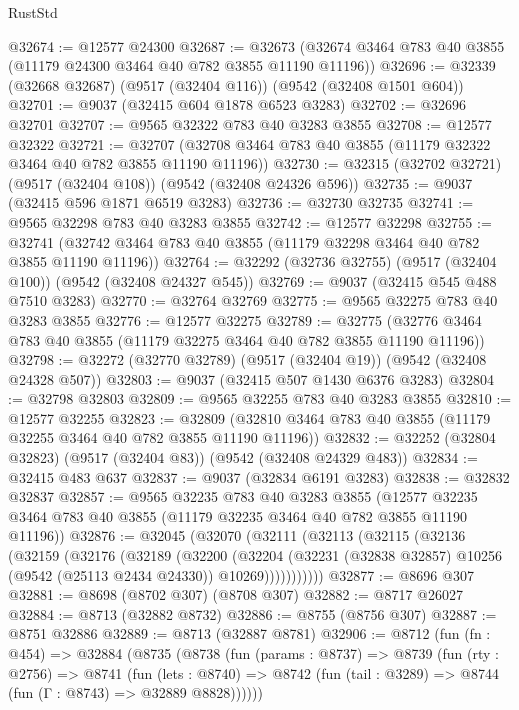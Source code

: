 \begin{lexlean}{RustStd}
\begin{coremodule}
@32674 := @12577 @24300
@32687 := @32673 (@32674 @3464 @783 @40 @3855 (@11179 @24300 @3464 @40 @782 @3855 @11190 @11196))
@32696 := @32339 (@32668 @32687) (@9517 (@32404 @116)) (@9542 (@32408 @1501 @604))
@32701 := @9037 (@32415 @604 @1878 @6523 @3283)
@32702 := @32696 @32701
@32707 := @9565 @32322 @783 @40 @3283 @3855
@32708 := @12577 @32322
@32721 := @32707 (@32708 @3464 @783 @40 @3855 (@11179 @32322 @3464 @40 @782 @3855 @11190 @11196))
@32730 := @32315 (@32702 @32721) (@9517 (@32404 @108)) (@9542 (@32408 @24326 @596))
@32735 := @9037 (@32415 @596 @1871 @6519 @3283)
@32736 := @32730 @32735
@32741 := @9565 @32298 @783 @40 @3283 @3855
@32742 := @12577 @32298
@32755 := @32741 (@32742 @3464 @783 @40 @3855 (@11179 @32298 @3464 @40 @782 @3855 @11190 @11196))
@32764 := @32292 (@32736 @32755) (@9517 (@32404 @100)) (@9542 (@32408 @24327 @545))
@32769 := @9037 (@32415 @545 @488 @7510 @3283)
@32770 := @32764 @32769
@32775 := @9565 @32275 @783 @40 @3283 @3855
@32776 := @12577 @32275
@32789 := @32775 (@32776 @3464 @783 @40 @3855 (@11179 @32275 @3464 @40 @782 @3855 @11190 @11196))
@32798 := @32272 (@32770 @32789) (@9517 (@32404 @19)) (@9542 (@32408 @24328 @507))
@32803 := @9037 (@32415 @507 @1430 @6376 @3283)
@32804 := @32798 @32803
@32809 := @9565 @32255 @783 @40 @3283 @3855
@32810 := @12577 @32255
@32823 := @32809 (@32810 @3464 @783 @40 @3855 (@11179 @32255 @3464 @40 @782 @3855 @11190 @11196))
@32832 := @32252 (@32804 @32823) (@9517 (@32404 @83)) (@9542 (@32408 @24329 @483))
@32834 := @32415 @483 @637
@32837 := @9037 (@32834 @6191 @3283)
@32838 := @32832 @32837
@32857 := @9565
    @32235
    @783
    @40
    @3283
    @3855
    (@12577 @32235 @3464 @783 @40 @3855 (@11179 @32235 @3464 @40 @782 @3855 @11190 @11196))
@32876 := @32045
    (@32070
      (@32111
        (@32113
          (@32115
            (@32136
              (@32159
                (@32176
                  (@32189
                    (@32200
                      (@32204
                        (@32231
                          (@32838 @32857)
                          @10256
                          (@9542 (@25113 @2434 @24330))
                          @10269)))))))))))
@32877 := @8696 @307
@32881 := @8698 (@8702 @307) (@8708 @307)
@32882 := @8717 @26027
@32884 := @8713 (@32882 @8732)
@32886 := @8755 (@8756 @307)
@32887 := @8751 @32886
@32889 := @8713 (@32887 @8781)
@32906 := @8712
    (fun (fn : @454) =>
    @32884
      (@8735
        (@8738
          (fun (params : @8737) =>
          @8739
            (fun (rty : @2756) =>
            @8741
              (fun (lets : @8740) =>
              @8742 (fun (tail : @3289) => @8744 (fun (Γ : @8743) => @32889 @8828))))))

\end{coremodule}
\end{lexlean}
